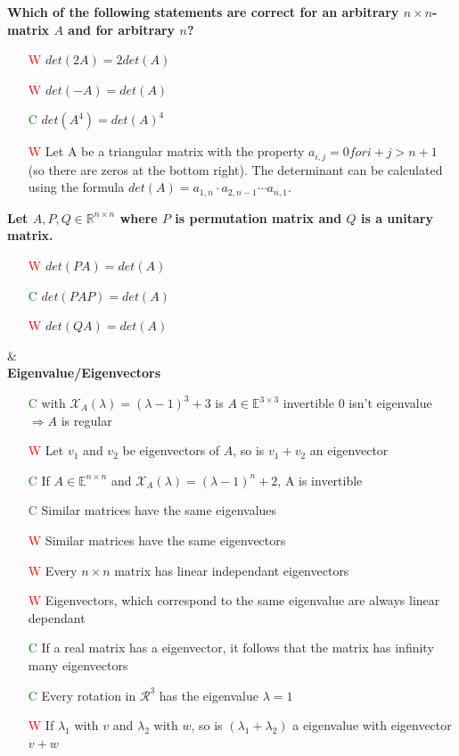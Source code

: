 \documentclass[7pt,landscape, margin = 0.1mm]{article}
\begin{document}
\begin{multicols}{4}
\begin{flushleft}
\textbf{Which of the following statements are correct for an arbitrary $n \times n$-matrix $A $ and for arbitrary $ n$? }
\begin{itemize}
\item[\textcolor{red}{W}]$  det (2A) = 2 det(A)$
\item[\textcolor{red}{W}] $ det(-A) = det(A)$
\item[\textcolor{green}{C}] $det (A^4) = det(A)^4$
\item[\textcolor{red}{W}] Let A be a triangular matrix with the property $a_{i,j} = 0 for i + j > n + 1$ (so there are zeros at the
bottom right). The determinant can be calculated using the formula $det(A) = a_{1,n} \cdot a_{2,n−1} \cdots a_{n,1}$.
\end{itemize}
\hspace{3mm}
\textbf{Let $A,P,Q  \in \mathbb{R}^{n \times n} $ where $P$ is permutation matrix and $Q$ is a unitary matrix. }
\begin{itemize}
\item[\textcolor{red}{W}] $det(PA) = det(A)$
\item[\textcolor{green}{C}] $det(PAP) = det(A) $
\item[\textcolor{red}{W}] $det(QA) = det(A)$

\end{itemize}

\hspace{3mm}
\hline & \\[3mm]
\scriptsize
\textbf{Eigenvalue/Eigenvectors}
\tiny \\
\begin{itemize}
\item[\textcolor{green}{C}] with $ \mathcal{X}_A(\lambda) = (\lambda -1)^3 +3 $ is $A \in \mathbb{E}^{3 \times 3}$ invertible 
\textcolor{Emerald}{0 isn't eigenvalue $\Rightarrow  A$ is regular }

\item[\textcolor{red}{W}] Let $v_1 $ and $v_2 $ be eigenvectors of $A$, so is $v_1+v_2$ an eigenvector
\item[\textcolor{green}{C}] If $A  \in \mathbb{E}^{n \times n} $ and $\mathcal{X}_A(\lambda) = (\lambda-1)^n+2 $, A is invertible
\item[\textcolor{green}{C}] Similar matrices have the same eigenvalues
\item[\textcolor{red}{W}] Similar matrices have the same eigenvectors
\item[\textcolor{red}{W}] Every $n \times n $ matrix has linear independant eigenvectors
\item[\textcolor{red}{W}] Eigenvectors, which correspond to the same eigenvalue are always linear dependant
\item[\textcolor{green}{C}] If a real matrix has a eigenvector, it follows that the matrix has infinity many eigenvectors
\item[\textcolor{green}{C}] Every rotation in $\mathcal{R}^3 $ has the eigenvalue $\lambda = 1 $
\item[\textcolor{red}{W}] If $\lambda_1$ with $v$ and $\lambda_2$ with $w$, so is $(\lambda_1 + \lambda_2)$ a eigenvalue with eigenvector $v+w$


\end{itemize}
\end{flushleft}
\end{multicols}
\end{document}
